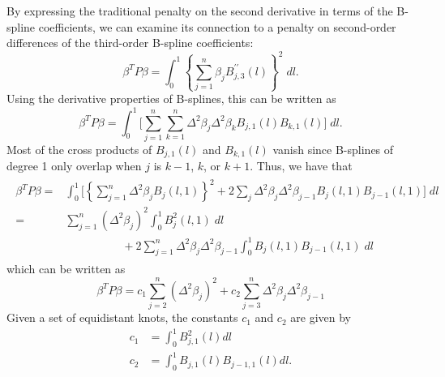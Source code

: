 \documentclass[12pt]{article}
\theoremstyle{definition}
\begin{document}
By expressing the traditional penalty on the second derivative in terms of the B-spline coefficients, we can examine its connection to a penalty on second-order differences of the third-order B-spline coefficients:
\begin{equation} \label{eq:second-derivative-bspline-penalty}
\beta^T P \beta = \int_{0}^{1} \left\{ \sum\limits_{j=1}^n  \beta_j B_{j,3}^{\prime \prime} \left(l\right) \right\}^2\; dl.
\end{equation}
\noindent
Using the derivative properties of B-splines, this can be written as 
\begin{equation} \label{eq:second-derivative-bspline-penalty}
\beta^T P \beta =  \int_{0}^{1}  \bigg[ \sum\limits_{j=1}^n \sum\limits_{k=1}^n \Delta^2 \beta_j \Delta^2 \beta_k B_{j,1}\left(l\right)B_{k,1}\left(l\right)\bigg]\; dl  . 
\end{equation}
\noindent
Most of the cross products of $B_{j,1}\left(l\right)$ and $B_{k,1}\left( l \right)$ vanish since B-splines of degree 1 only overlap when $j$ is $k-1$, $k$, or $k+1$. Thus, we have that
\begin{align}
\begin{split}
\beta^T P \beta = {} &  \int_0^1 \bigg[ \left\{ \sum\limits_{j=1}^n   \Delta^2 \beta_j  B_j\left(l,1\right)  \right\}^2  + 2 \sum_{j}\Delta^2 \beta_j\Delta^2 \beta_{j-1}B_j\left(l,1\right)B_{j-1}\left(l,1\right) \bigg]\; dl \\ 
= {} & \sum \limits_{j=1}^n  \left( \Delta^2\beta_j \right)^2 \int_0^1 B_j^2\left(l,1\right)\;dl \\
   &{} \;\;\;\;\;\;\;\;\;\;\;\;\;\;\;\;\;\; + 2 \sum\limits_{j=1}^n \Delta^2 \beta_j\Delta^2 \beta_{j-1} \int_0^1 B_j\left(l,1\right)B_{j-1}\left(l,1\right)\;dl 
\end{split}
\end{align}
\noindent
which can be written as
\begin{equation} \label{eq:derivative-penalty-difference-penalty-connection}
\beta^T P \beta = c_1 \sum\limits_{j=2}^n \left( \Delta^2 \beta_j\right)^2 + c_2 \sum\limits_{j=3}^n \Delta^2 \beta_j\Delta^2 \beta_{j-1}
\end{equation}
\noindent
Given a set of equidistant knots, the constants $c_1$ and $c_2$ are given by
\begin{equation}
\begin{split}
c_1 & =   \int_0^1 B_{j,1}^2\left(l\right) dl\\
c_2 & = \int_0^1 B_{j,1}\left(l\right)B_{j-1,1}\left(l\right) dl.
\end{split}
\end{equation}
\end{document}
